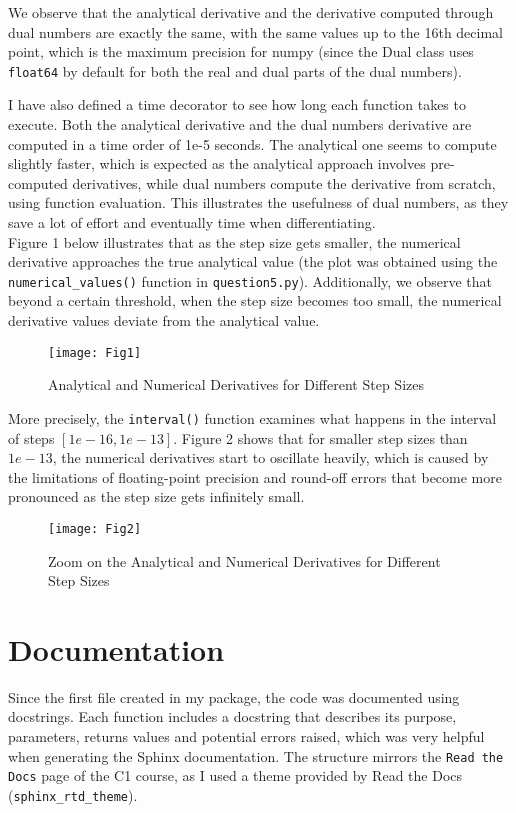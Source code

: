\documentclass[a4paper,12pt]{article}
\begin{document}
We observe that the analytical derivative and the derivative computed through dual numbers are exactly the same, with the same values up to the 16th decimal point, which is the maximum precision for numpy (since the Dual class uses \texttt{float64} by default for both the real and dual parts of the dual numbers). 

I have also defined a time decorator to see how long each function takes to execute. Both the analytical derivative and the dual numbers derivative are computed in a time order of 1e-5 seconds. The analytical one seems to compute slightly faster, which is expected as the analytical approach involves pre-computed derivatives, while dual numbers compute the derivative from scratch, using function evaluation. This illustrates the usefulness of dual numbers, as they save a lot of effort and eventually time when differentiating.
\\

Figure 1 below illustrates that as the step size gets smaller, the numerical derivative approaches the true analytical value (the plot was obtained using the \texttt{numerical\_values()} function in \texttt{question5.py}). Additionally, we observe that beyond a certain threshold, when the step size becomes too small, the numerical derivative values deviate from the analytical value.
 \begin{figure}[H]
    \centering
    \texttt{[image: Fig1]} 
    \caption{Analytical and Numerical Derivatives for Different Step Sizes}
\end{figure}

More precisely, the \texttt{interval()} function examines what happens in the interval of steps \([1e-16, 1e-13]\). Figure 2 shows that for smaller step sizes than \(1e-13\), the numerical derivatives start to oscillate heavily, which is caused by the limitations of floating-point precision and round-off errors that become more pronounced as the step size gets infinitely small.

 \begin{figure}[H]
    \centering
    \texttt{[image: Fig2]} 
    \caption{Zoom on the Analytical and Numerical Derivatives for Different Step Sizes}
\end{figure}

\section{Documentation}
\label{sec:documentation}
Since the first file created in my package, the code was documented using docstrings. Each function includes a docstring that describes its purpose, parameters, returns values and potential errors raised, which was very helpful when generating the Sphinx documentation. The structure mirrors the \texttt{Read the Docs} page of the C1 course, as I used a theme provided by Read the Docs (\texttt{sphinx\_rtd\_theme}). 
\end{document}
